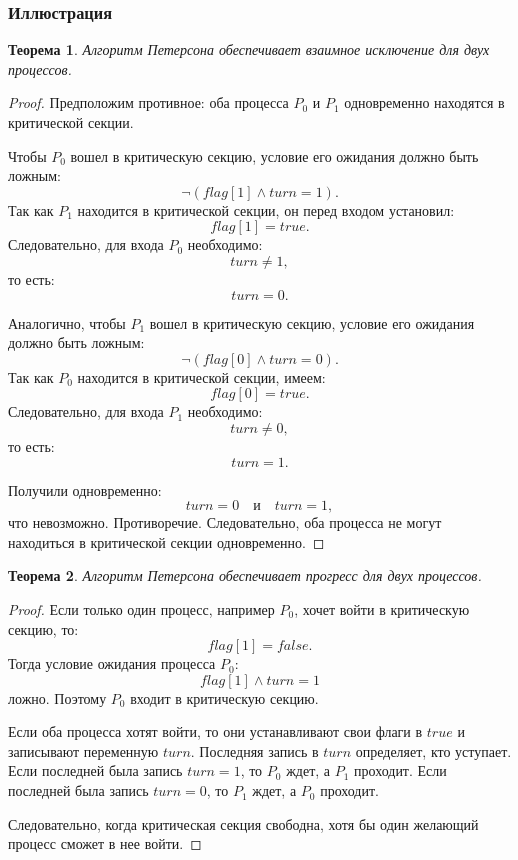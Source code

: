 \documentclass[12pt,a4paper]{article}
\newtheorem{theorem}{Теорема}
\begin{document}
\subsubsection{Иллюстрация}

\begin{center}
\end{center}

\begin{theorem}
Алгоритм Петерсона обеспечивает взаимное исключение для двух процессов.
\end{theorem}

\begin{proof}
Предположим противное: оба процесса $P_0$ и $P_1$ одновременно находятся в критической секции.

Чтобы $P_0$ вошел в критическую секцию, условие его ожидания должно быть ложным:
\[
\neg(flag[1] \land turn = 1).
\]
Так как $P_1$ находится в критической секции, он перед входом установил:
\[
flag[1] = true.
\]
Следовательно, для входа $P_0$ необходимо:
\[
turn \neq 1,
\]
то есть:
\[
turn = 0.
\]

Аналогично, чтобы $P_1$ вошел в критическую секцию, условие его ожидания должно быть ложным:
\[
\neg(flag[0] \land turn = 0).
\]
Так как $P_0$ находится в критической секции, имеем:
\[
flag[0] = true.
\]
Следовательно, для входа $P_1$ необходимо:
\[
turn \neq 0,
\]
то есть:
\[
turn = 1.
\]

Получили одновременно:
\[
turn = 0 \quad \text{и} \quad turn = 1,
\]
что невозможно. Противоречие. Следовательно, оба процесса не могут находиться в критической секции одновременно.
\end{proof}

\begin{theorem}
Алгоритм Петерсона обеспечивает прогресс для двух процессов.
\end{theorem}

\begin{proof}
Если только один процесс, например $P_0$, хочет войти в критическую секцию, то:
\[
flag[1] = false.
\]
Тогда условие ожидания процесса $P_0$:
\[
flag[1] \land turn = 1
\]
ложно. Поэтому $P_0$ входит в критическую секцию.

Если оба процесса хотят войти, то они устанавливают свои флаги в $true$ и записывают переменную $turn$. Последняя запись в $turn$ определяет, кто уступает. Если последней была запись $turn = 1$, то $P_0$ ждет, а $P_1$ проходит. Если последней была запись $turn = 0$, то $P_1$ ждет, а $P_0$ проходит.

Следовательно, когда критическая секция свободна, хотя бы один желающий процесс сможет в нее войти.
\end{proof}
\end{document}
